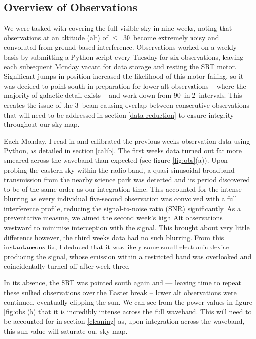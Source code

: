 \documentclass[a4paper]{jpconf}
\begin{document}
\begin{multicols}{2}
\section{Overview of Observations} \label{obs}

We were tasked with covering the full visible sky in nine weeks, noting that observations at an altitude (alt) of $\leq$~30\degree~become extremely noisy and convoluted from ground-based interference. Observations worked on a weekly basis by submitting a Python script every Tuesday for six observations, leaving each subsequent Monday vacant for data storage and resting the SRT motor. Significant jumps in position increased the likelihood of this motor failing, so it was decided to point south in preparation for lower alt observations -- where the majority of galactic detail exists -- and work down from 90\degree~in 2\degree~intervals. This creates the issue of the 3\degree~beam causing overlap between consecutive observations that will need to be addressed in section \ref{data reduction} to ensure integrity throughout our sky map.

Each Monday, I read in and calibrated the previous week\textquotesingle s observation data using Python, as detailed in section \ref{calib}. The first week\textquotesingle s data turned out far more smeared across the waveband than expected (see figure \ref{fig:obs}(a)). Upon probing the eastern sky within the radio-band, a quasi-sinusoidal broadband transmission from the nearby science park was detected and its period discovered to be of the same order as our integration time. This accounted for the intense blurring as every individual five-second observation was convolved with a full interference profile, reducing the signal-to-noise ratio (SNR) significantly. As a preventative measure, we aimed the second week’s high Alt observations westward to minimise interception with the signal. This brought about very little difference however, the third week\textquotesingle s data had no such blurring. From this instantaneous fix, I deduced that it was likely some small electronic device producing the signal, whose emission within a restricted band was overlooked and coincidentally turned off after week three.

In its absence, the SRT was pointed south again and –-- leaving time to repeat these sullied observations over the Easter break -- lower alt observations were continued, eventually clipping the sun. We can see from the power values in figure \ref{fig:obs}(b) that it is incredibly intense across the full waveband. This will need to be accounted for in section \ref{cleaning} as, upon integration across the waveband, this sun value will saturate our sky map.


\end{multicols}
\end{document}
